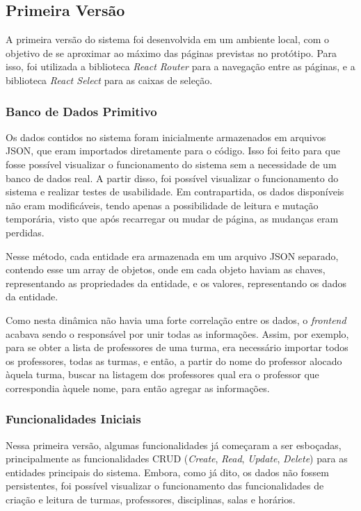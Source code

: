 
\subsection{Primeira Versão} %

A primeira versão do sistema foi desenvolvida em um ambiente local, com o objetivo de se aproximar ao máximo das páginas previstas no protótipo. Para isso, foi utilizada a biblioteca \textit{React Router} para a navegação entre as páginas, e a biblioteca \textit{React Select} para as caixas de seleção.

\subsubsection{Banco de Dados Primitivo}

Os dados contidos no sistema foram inicialmente armazenados em arquivos JSON, que eram importados diretamente para o código. Isso foi feito para que fosse possível visualizar o funcionamento do sistema sem a necessidade de um banco de dados real. A partir disso, foi possível visualizar o funcionamento do sistema e realizar testes de usabilidade. Em contrapartida, os dados disponíveis não eram modificáveis, tendo apenas a possibilidade de leitura e mutação temporária, visto que após recarregar ou mudar de página, as mudanças eram perdidas.

Nesse método, cada entidade era armazenada em um arquivo JSON separado, contendo esse um array de objetos, onde em cada objeto haviam as chaves, representando as propriedades da entidade, e os valores, representando os dados da entidade.

Como nesta dinâmica não havia uma forte correlação entre os dados, o \textit{frontend} acabava sendo o responsável por unir todas as informações. Assim, por exemplo, para se obter a lista de professores de uma turma, era necessário importar todos os professores, todas as turmas, e então, a partir do nome do professor alocado àquela turma, buscar na listagem dos professores qual era o professor que correspondia àquele nome, para então agregar as informações.

\subsubsection{Funcionalidades Iniciais}

Nessa primeira versão, algumas funcionalidades já começaram a ser esboçadas, principalmente as funcionalidades CRUD (\textit{Create}, \textit{Read}, \textit{Update}, \textit{Delete}) para as entidades principais do sistema. Embora, como já dito, os dados não fossem persistentes, foi possível visualizar o funcionamento das funcionalidades de criação e leitura de turmas, professores, disciplinas, salas e horários.

